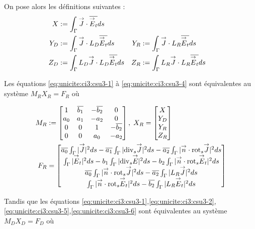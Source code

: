 			On pose alors les définitions suivantes :
			\begin{align*}
				X&:= \int_\Gamma \vJ \cdot \conj{\vE_t} ds\\
				Y_D&:= \int_\Gamma \vJ \cdot L_D \conj{\vE_t} ds
				&Y_R&:= \int_\Gamma \vJ \cdot L_R \conj{\vE_t} ds\\
				Z_D&:= \int_\Gamma L_D \vJ \cdot L_D \conj{\vE_t} ds
				&Z_R&:= \int_\Gamma L_R \vJ \cdot L_R \conj{\vE_t} ds
			\end{align*}

			Les équations \eqref{eq:unicite:ci3:csu3-1} à \eqref{eq:unicite:ci3:csu3-4} sont équivalentes au système \(M_R X_R = F_R\) où

			\begin{align*}
				M_R&:=
				\begin{bmatrix}
					1&\conj{b_1}&-\conj{b_2}&0\\
					a_0&a_1&-a_2&0\\
					0&0&1&-\conj{b_2}\\
					0&0&a_0&-a_2\\
				\end{bmatrix},\;
				X_R =
				\begin{bmatrix}
					X\\
					Y_D\\
					Y_R\\
					Z_R
				\end{bmatrix}\\
				F_R &=
				\begin{bmatrix}
					\conj{a_0} \int_\Gamma |\vJ|^2ds - \conj{a_1} \int_\Gamma |\tdivs \vJ|^2 ds - \conj{a_2} \int_\Gamma |\vn \cdot \trots \vJ|^2 ds \\
					\int_\Gamma |\vE_t|^2 ds  - b_1 \int_\Gamma | \tdivs \vE |^2 ds - b_2 \int_\Gamma | \vn \cdot \trots \vE_t|^2 ds \\
					\conj{a_0} \int_\Gamma |\vn \cdot \trots \vJ|^2ds - \conj{a_2} \int_\Gamma | L_R \vJ|^2 ds \\
					\int_\Gamma | \vn \cdot \trots \vE_t |^2 ds  - \conj{b_2} \int_\Gamma | L_R \vE_t|^2 ds
				\end{bmatrix}
			\end{align*}

			Tandis que les équations \eqref{eq:unicite:ci3:csu3-1},\eqref{eq:unicite:ci3:csu3-2},\eqref{eq:unicite:ci3:csu3-5},\eqref{eq:unicite:ci3:csu3-6} sont équivalentes au système \(M_D X_D= F_D\) où

